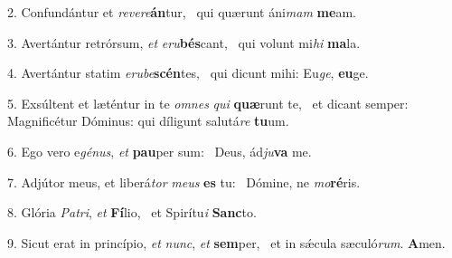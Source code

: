 2. Confundántur et \textit{re}\textit{ve}\textit{re}\textbf{án}tur, \ast\  qui quærunt áni\textit{mam} \textbf{me}am.\

3. Avertántur retrórsum, \textit{et} \textit{e}\textit{ru}\textbf{bés}cant, \ast\  qui volunt mi\textit{hi} \textbf{ma}la.\

4. Avertántur statim \textit{e}\textit{ru}\textit{be}\textbf{scén}tes, \ast\  qui dicunt mihi: Eu\textit{ge}, \textbf{eu}ge.\

5. Exsúltent et læténtur in te \textit{om}\textit{nes} \textit{qui} \textbf{quæ}runt te, \ast\  et dicant semper: Magnificétur Dóminus: qui díligunt salutá\textit{re} \textbf{tu}um.\

6. Ego vero e\textit{gé}\textit{nus}, \textit{et} \textbf{pau}per sum: \ast\  Deus, ád\textit{ju}\textbf{va} me.\

7. Adjútor meus, et liberá\textit{tor} \textit{me}\textit{us} \textbf{es} tu: \ast\  Dómine, ne \textit{mo}\textbf{ré}ris.\

8. Glória \textit{Pa}\textit{tri}, \textit{et} \textbf{Fí}lio, \ast\  et Spirítu\textit{i} \textbf{Sanc}to.\

9. Sicut erat in princípio, \textit{et} \textit{nunc}, \textit{et} \textbf{sem}per, \ast\  et in sǽcula sæculó\textit{rum}. \textbf{A}men.\

